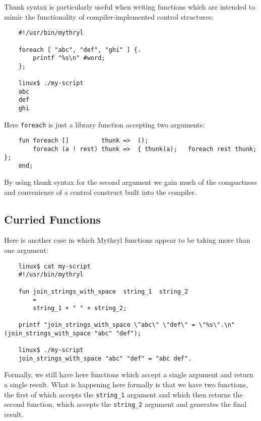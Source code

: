 Thunk syntax is particularly useful when writing functions which 
are intended to mimic the functionality of compiler-implemented 
control structures:

\begin{verbatim}
    #!/usr/bin/mythryl

    foreach [ "abc", "def", "ghi" ] {.
        printf "%s\n" #word;
    };

    linux$ ./my-script
    abc
    def
    ghi
\end{verbatim}

Here {\tt foreach} is just a library function accepting two 
arguments:

\begin{verbatim}
    fun foreach []         thunk =>  ();
        foreach (a ! rest) thunk =>  { thunk(a);   foreach rest thunk; };
    end;
\end{verbatim}

By using thunk syntax for the second argument we gain much of the compactness 
and convenience of a control construct built into the compiler.

\cutend*



\subsection{Curried Functions}
\label{section:ref:functions:curried-functions}

Here is another case in which Mythryl functions appear to be taking 
more than one argument:

\begin{verbatim}
    linux$ cat my-script
    #!/usr/bin/mythryl

    fun join_strings_with_space  string_1  string_2
        =
        string_1 + " " + string_2;

    printf "join_strings_with_space \"abc\" \"def\" = \"%s\".\n" (join_strings_with_space "abc" "def");

    linux$ ./my-script
    join_strings_with_space "abc" "def" = "abc def".
\end{verbatim}

Formally, we still have here functions which accept a single 
argument and return a single result.  What is happening here 
formally is that we have two functions, the first of which 
accepts the {\tt string\_1} argument and which then returns 
the second function, which accepts the {\tt string\_2} argument 
and generates the final result.

